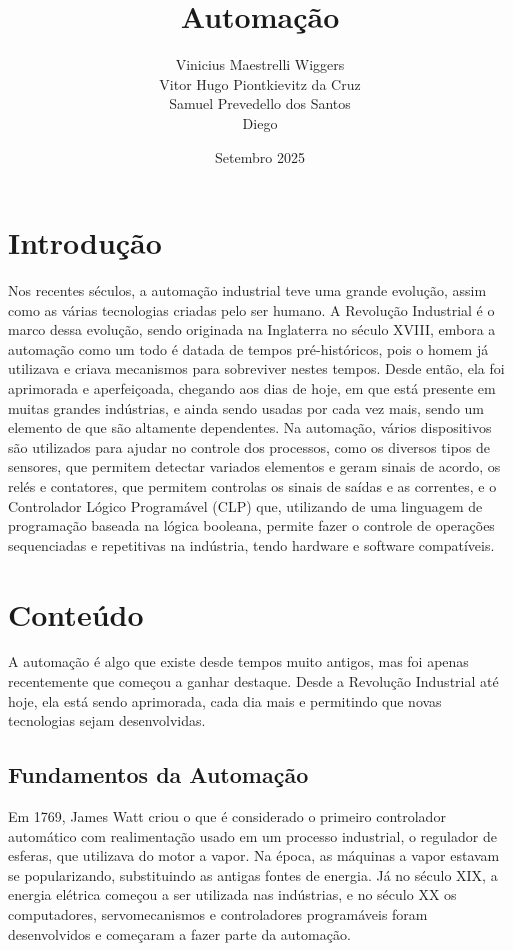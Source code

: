 \documentclass{article}
\title{Automação}
\author{%
	Vinicius Maestrelli Wiggers\\[0.5em]
	Vitor Hugo Piontkievitz da Cruz\\[0.5em]
	Samuel Prevedello dos Santos\\[0.5em]
	Diego
}
\date{Setembro 2025}
\begin{document}
\maketitle

\section{Introdução}

Nos recentes séculos, a automação industrial teve uma grande evolução, assim como as várias tecnologias criadas pelo ser humano. A Revolução Industrial é o marco dessa evolução, sendo originada na Inglaterra no século XVIII, embora a automação como um todo é datada de tempos pré-históricos, pois o homem já utilizava e criava mecanismos para sobreviver nestes tempos. Desde então, ela foi aprimorada e aperfeiçoada, chegando aos dias de hoje, em que está presente em muitas grandes indústrias, e ainda sendo usadas por cada vez mais, sendo um elemento de que são altamente dependentes. Na automação, vários dispositivos são utilizados para ajudar no controle dos processos, como os diversos tipos de sensores, que permitem detectar variados elementos e geram sinais de acordo, os relés e contatores, que permitem controlas os sinais de saídas e as correntes, e o Controlador Lógico Programável (CLP) que, utilizando de uma linguagem de programação baseada na lógica booleana, permite fazer o controle de operações sequenciadas e repetitivas na indústria, tendo hardware e software compatíveis.  

\section{Conteúdo}

A automação é algo que existe desde tempos muito antigos, mas foi apenas recentemente que começou a ganhar destaque. Desde a Revolução Industrial até hoje, ela está sendo aprimorada, cada dia mais e permitindo que novas tecnologias sejam desenvolvidas.

\subsection{Fundamentos da Automação}

Em 1769, James Watt criou o que é considerado o primeiro controlador automático com realimentação usado em um processo industrial, o regulador de esferas, que utilizava do motor a vapor. Na época, as máquinas a vapor estavam se popularizando, substituindo as antigas fontes de energia. Já no século XIX, a energia elétrica começou a ser utilizada nas indústrias, e no século XX os computadores, servomecanismos e controladores programáveis foram desenvolvidos e começaram a fazer parte da automação. 
\end{document}
